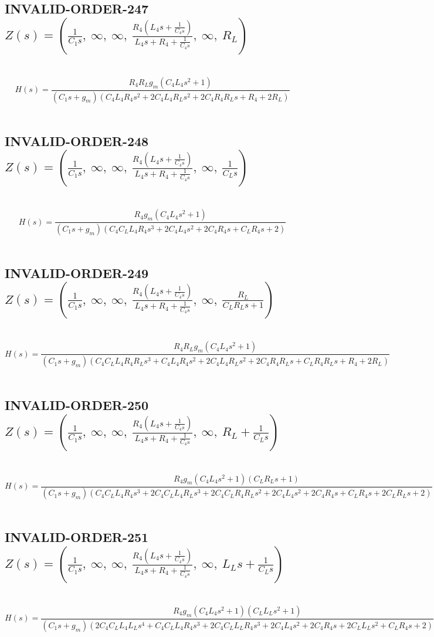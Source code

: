 \documentclass{article}
\begin{document}
\subsection{INVALID-ORDER-247 $Z(s) = \left( \frac{1}{C_{1} s}, \  \infty, \  \infty, \  \frac{R_{4} \left(L_{4} s + \frac{1}{C_{4} s}\right)}{L_{4} s + R_{4} + \frac{1}{C_{4} s}}, \  \infty, \  R_{L}\right)$ } \ 
\textbf{\[H(s) = \frac{R_{4} R_{L} g_{m} \left(C_{4} L_{4} s^{2} + 1\right)}{\left(C_{1} s + g_{m}\right) \left(C_{4} L_{4} R_{4} s^{2} + 2 C_{4} L_{4} R_{L} s^{2} + 2 C_{4} R_{4} R_{L} s + R_{4} + 2 R_{L}\right)}\] } \ 
\subsection{INVALID-ORDER-248 $Z(s) = \left( \frac{1}{C_{1} s}, \  \infty, \  \infty, \  \frac{R_{4} \left(L_{4} s + \frac{1}{C_{4} s}\right)}{L_{4} s + R_{4} + \frac{1}{C_{4} s}}, \  \infty, \  \frac{1}{C_{L} s}\right)$ } \ 
\textbf{\[H(s) = \frac{R_{4} g_{m} \left(C_{4} L_{4} s^{2} + 1\right)}{\left(C_{1} s + g_{m}\right) \left(C_{4} C_{L} L_{4} R_{4} s^{3} + 2 C_{4} L_{4} s^{2} + 2 C_{4} R_{4} s + C_{L} R_{4} s + 2\right)}\] } \ 
\subsection{INVALID-ORDER-249 $Z(s) = \left( \frac{1}{C_{1} s}, \  \infty, \  \infty, \  \frac{R_{4} \left(L_{4} s + \frac{1}{C_{4} s}\right)}{L_{4} s + R_{4} + \frac{1}{C_{4} s}}, \  \infty, \  \frac{R_{L}}{C_{L} R_{L} s + 1}\right)$ } \ 
\textbf{\[H(s) = \frac{R_{4} R_{L} g_{m} \left(C_{4} L_{4} s^{2} + 1\right)}{\left(C_{1} s + g_{m}\right) \left(C_{4} C_{L} L_{4} R_{4} R_{L} s^{3} + C_{4} L_{4} R_{4} s^{2} + 2 C_{4} L_{4} R_{L} s^{2} + 2 C_{4} R_{4} R_{L} s + C_{L} R_{4} R_{L} s + R_{4} + 2 R_{L}\right)}\] } \ 
\subsection{INVALID-ORDER-250 $Z(s) = \left( \frac{1}{C_{1} s}, \  \infty, \  \infty, \  \frac{R_{4} \left(L_{4} s + \frac{1}{C_{4} s}\right)}{L_{4} s + R_{4} + \frac{1}{C_{4} s}}, \  \infty, \  R_{L} + \frac{1}{C_{L} s}\right)$ } \ 
\textbf{\[H(s) = \frac{R_{4} g_{m} \left(C_{4} L_{4} s^{2} + 1\right) \left(C_{L} R_{L} s + 1\right)}{\left(C_{1} s + g_{m}\right) \left(C_{4} C_{L} L_{4} R_{4} s^{3} + 2 C_{4} C_{L} L_{4} R_{L} s^{3} + 2 C_{4} C_{L} R_{4} R_{L} s^{2} + 2 C_{4} L_{4} s^{2} + 2 C_{4} R_{4} s + C_{L} R_{4} s + 2 C_{L} R_{L} s + 2\right)}\] } \ 
\subsection{INVALID-ORDER-251 $Z(s) = \left( \frac{1}{C_{1} s}, \  \infty, \  \infty, \  \frac{R_{4} \left(L_{4} s + \frac{1}{C_{4} s}\right)}{L_{4} s + R_{4} + \frac{1}{C_{4} s}}, \  \infty, \  L_{L} s + \frac{1}{C_{L} s}\right)$ } \ 
\textbf{\[H(s) = \frac{R_{4} g_{m} \left(C_{4} L_{4} s^{2} + 1\right) \left(C_{L} L_{L} s^{2} + 1\right)}{\left(C_{1} s + g_{m}\right) \left(2 C_{4} C_{L} L_{4} L_{L} s^{4} + C_{4} C_{L} L_{4} R_{4} s^{3} + 2 C_{4} C_{L} L_{L} R_{4} s^{3} + 2 C_{4} L_{4} s^{2} + 2 C_{4} R_{4} s + 2 C_{L} L_{L} s^{2} + C_{L} R_{4} s + 2\right)}\] } \ 
\end{document}

